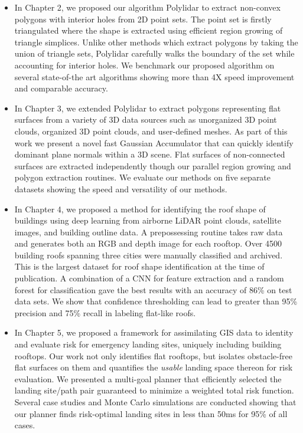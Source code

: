 \begin{itemize}
    \item In Chapter 2, we proposed our algorithm Polylidar to extract non-convex polygons with interior holes from 2D point sets. The point set is firstly triangulated where the shape is extracted using efficient region growing of triangle simplices. Unlike other methods which extract polygons by taking the union of triangle sets, Polylidar carefully walks the boundary of the set while accounting for interior holes. We benchmark our proposed algorithm on several state-of-the art algorithms showing more than 4X speed improvement and comparable accuracy.  
    \item In Chapter 3, we extended Polylidar to extract polygons representing flat surfaces from a variety of 3D data sources such as unorganized 3D point clouds, organized 3D point clouds, and user-defined meshes. As part of this work we present a novel fast Gaussian Accumulator that can quickly identify dominant plane normals within a 3D scene. Flat surfaces of non-connected surfaces are extracted independently though our parallel region growing and polygon extraction routines. We evaluate our methods on five separate datasets showing the speed and versatility of our methods.
    \item In Chapter 4, we proposed a method for identifying the roof shape of buildings using deep learning from airborne LiDAR point clouds, satellite images, and building outline data. A prepossessing routine takes raw data and generates both an RGB and depth image for each rooftop. Over 4500 building roofs spanning three cities were manually classified and archived. This is the largest dataset for roof shape identification at the time of publication. A combination of a \ac{CNN} for feature extraction and a random forest for classification gave the best results with an accuracy of 86\% on test data sets.  We show that confidence thresholding can lead to greater than 95\% precision and 75\% recall in labeling flat-like roofs.
    \item In Chapter 5, we proposed a framework for assimilating \ac{GIS} data to identity and evaluate risk for emergency landing sites, uniquely including building rooftops. Our work not only identifies flat rooftops, but isolates obstacle-free flat surfaces on them and quantifies the \emph{usable} landing space thereon for risk evaluation. We presented a multi-goal planner that efficiently selected the landing site/path pair guaranteed to minimize a weighted total risk function. Several case studies and Monte Carlo simulations are conducted showing that our planner finds risk-optimal landing sites in  less than 50ms for 95\% of all cases.

\end{itemize}

